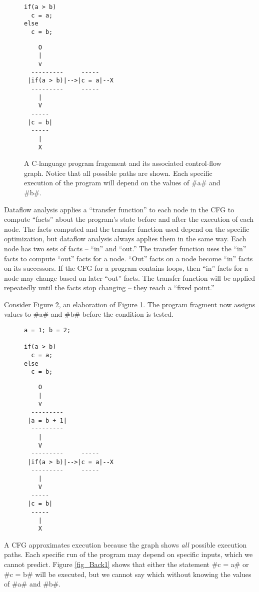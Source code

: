 \documentclass[12pt]{report}
\begin{document}
\begin{figure}[t]
\begin{Verbatim}
if(a > b)
  c = a;
else
  c = b;
\end{Verbatim}
\begin{Verbatim}
    O
    |
    v
  ---------     -----
 |if(a > b)|-->|c = a|--X
  ---------     -----
    |
    V
  -----
 |c = b|
  -----
    |
    X
\end{Verbatim}
\caption{A C-language program fragement and its associated
  control-flow graph. Notice that all possible paths are shown. Each
  specific execution of the program will depend on the values of #a#
  and #b#.}
\label{fig_back1}
\end{figure}

Dataflow analysis applies a ``transfer function'' to each node in the
CFG to compute ``facts'' about the program's state before and after
the execution of each node. The facts computed and the transfer
function used depend on the specific optimization, but dataflow
analysis always applies them in the same way. Each node has two sets
of facts -- ``in'' and ``out.'' The transfer function uses the ``in''
facts to compute ``out'' facts for a node. ``Out'' facts on a node
become ``in'' facts on its successors.  If the CFG for a program
contains loops, then ``in'' facts for a node may change based on later
``out'' facts. The transfer function will be applied repeatedly until
the facts stop changing -- they reach a ``fixed point.''

Consider Figure \ref{fig_back2}, an elaboration of Figure
\ref{fig_back1}. The program fragment now assigns values to #a# and #b#
before the condition is tested. 

\begin{figure}[t]
\begin{Verbatim}
a = 1; b = 2;

if(a > b)
  c = a;
else
  c = b;
\end{Verbatim}
\begin{Verbatim}
    O
    |
    v
  ---------
 |a = b + 1|
  ---------
    |
    V
  ---------     -----
 |if(a > b)|-->|c = a|--X
  ---------     -----
    |
    V
  -----
 |c = b|
  -----
    |
    X
\end{Verbatim}
\caption{}
\label{fig_back2}
\end{figure}

A CFG approximates execution because the graph shows \emph{all}
possible execution paths. Each specific run of the program may depend
on specific inputs, which we cannot predict. Figure \ref{fig_Back1}
shows that either the statement #c = a# or #c = b# will be
executed, but we cannot say which without knowing the values of #a# and
#b#. 
\end{document}
